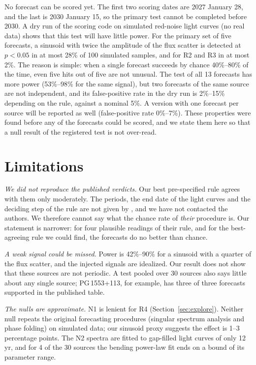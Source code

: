 \documentclass[twocolumn]{aastex631}
\begin{document}
No forecast can be scored yet. The first two scoring dates are 2027 January 28, and the last is 2030 January 15, so the primary test cannot be completed before 2030.
A dry run of the scoring code on simulated red-noise light curves (no real data) shows that this test will have little power. For the primary set of five forecasts, a sinusoid with twice the amplitude of the flux scatter is detected at $p<0.05$ in at most 28\% of 100 simulated samples, and for R2 and R3 in at most 2\%. The reason is simple: when a single forecast succeeds by chance 40\%--80\% of the time, even five hits out of five are not unusual. The test of all 13 forecasts has more power (53\%--98\% for the same signal), but two forecasts of the same source are not independent, and its false-positive rate in the dry run is 2\%--15\% depending on the rule, against a nominal 5\%. A version with one forecast per source will be reported as well (false-positive rate 0\%--7\%). These properties were found before any of the forecasts could be scored, and we state them here so that a null result of the registered test is not over-read.

\section{Limitations} \label{sec:limits}

\textit{We did not reproduce the published verdicts.} Our best pre-specified rule agrees with them only moderately. The periods, the end date of the light curves and the deciding step of the rule are not given by \citet{penil26}, and we have not contacted the authors. We therefore cannot say what the chance rate of \emph{their} procedure is. Our statement is narrower: for four plausible readings of their rule, and for the best-agreeing rule we could find, the forecasts do no better than chance.

\textit{A weak signal could be missed.} Power is 42\%--90\% for a sinusoid with a quarter of the flux scatter, and the injected signals are idealized. Our result does not show that these sources are not periodic. A test pooled over 30 sources also says little about any single source; PG\,1553+113, for example, has three of three forecasts supported in the published table.

\textit{The nulls are approximate.} N1 is lenient for R4 (Section~\ref{sec:explore}). Neither null repeats the original forecasting procedures (singular spectrum analysis and phase folding) on simulated data; our sinusoid proxy suggests the effect is 1--3 percentage points. The N2 spectra are fitted to gap-filled light curves of only 12\,yr, and for 4 of the 30 sources the bending power-law fit ends on a bound of its parameter range.
\end{document}
